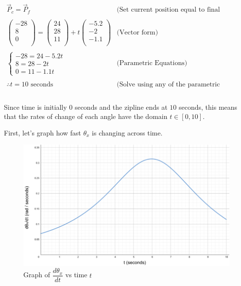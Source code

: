 \documentclass[12pt]{article}
\begin{document}
$$
\begin{array}{l|c}
    \vec P_c = \vec P_f & \text{(Set current position equal to final position)}\\ \\
    \begin{pmatrix} -28 \\ 8 \\ 0 \\ \end{pmatrix} = \begin{pmatrix} 24 \\ 28 \\ 11 \\ \end{pmatrix} + t \begin{pmatrix} -5.2 \\ -2 \\ -1.1 \\ \end{pmatrix} & \text{(Vector form)}\\ \\
    \begin{cases}
      -28 = 24-5.2t \\
      8 = 28-2t \\
      0 = 11-1.1t 
    \end{cases} & \text{(Parametric Equations)} \\ \\
    \boxed{\therefore t = 10 \text{ seconds}} & \text{(Solve using any of the parametric equations)}\\
 \end{array} 
$$
\\
Since time is initially $0$ seconds and the zipline ends at $10$ seconds, this means that the rates of change of each angle have the domain $t \in [0,10]$.

First, let's graph how fast $\theta_x$ is changing across time.

\begin{figure}[H]
\centering
\includegraphics[width=500pt]{img/graph1.png}
\caption{\label{fig:3}Graph of $\dfrac{d\theta_x}{dt}$ vs time $t$}
\end{figure}
\end{document}
